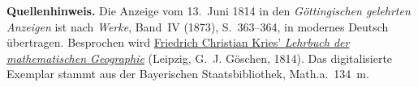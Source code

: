 \par\medskip\begin{small}\noindent\textbf{Quellenhinweis.} Die Anzeige vom 13.~Juni 1814 in den \textit{Göttingischen gelehrten Anzeigen} ist nach \textit{Werke}, Band~IV (1873), S.~363--364, in modernes Deutsch übertragen. Besprochen wird \href{https://archive.org/details/10080856bsb}{Friedrich Christian Kries' \textit{Lehrbuch der mathematischen Geographie}} (Leipzig, G.~J. Göschen, 1814). Das digitalisierte Exemplar stammt aus der Bayerischen Staatsbibliothek, Math.a.~134~m.\par\end{small}
